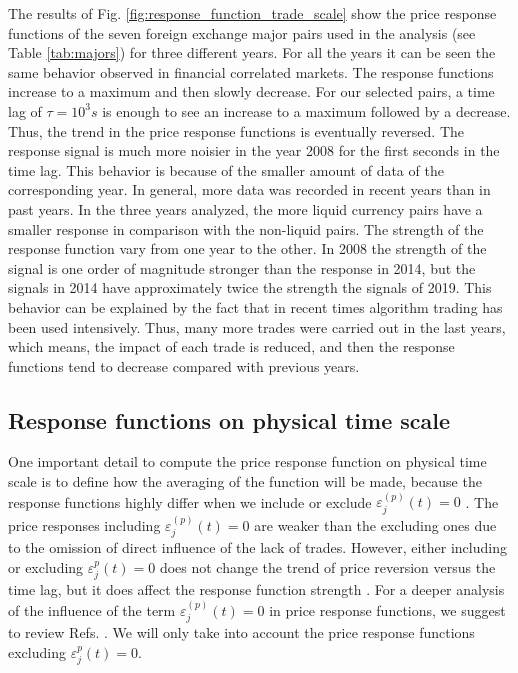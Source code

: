 The results of Fig. \ref{fig:response_function_trade_scale} show the
price response functions of the seven foreign exchange major pairs used in the
analysis (see Table \ref{tab:majors}) for three different years. For all the
years it can be seen the same behavior observed in financial correlated
markets. The response functions increase to a maximum and then slowly decrease.
For our selected pairs, a time lag of $\tau = 10^{3}s$ is enough to see an
increase to a maximum followed by a decrease. Thus, the trend in the price
response functions is eventually reversed. The response signal is much more
noisier in the year 2008 for the first seconds in the time lag. This behavior
is because of the smaller amount of data of the corresponding year. In general,
more data was recorded in recent years than in past years. In the three years
analyzed, the more liquid currency pairs have a smaller response in comparison
with the non-liquid pairs. The strength of the response function vary from one
year to the other. In 2008 the strength of the signal is one order of magnitude
stronger than the response in 2014, but the signals in 2014 have approximately
twice the strength the signals of 2019. This behavior can be explained by the
fact that in recent times algorithm trading has been used intensively. Thus,
many more trades were carried out in the last years, which means, the impact of
each trade is reduced, and then the response functions tend to decrease
compared with previous years.

\subsection{Response functions on physical time scale}
\label{subsec:response_function_physical}

One important detail to compute the price response function on physical time
scale is to define how the averaging of the function will be made, because the
response functions highly differ when we include or exclude
$\varepsilon^{\left(p\right)}_j \left( t\right) = 0$ \cite{Wang_2016_cross}.
The price responses including
$\varepsilon^{\left(p\right)}_j \left( t\right) = 0$ are weaker than the
excluding ones due to the omission of direct influence of the lack of trades.
However, either including or excluding $\varepsilon^{p}_j \left( t\right) = 0$
does not change the trend of price reversion versus the time lag, but it does
affect the response function strength \cite{Wang_2016_avg}. For a deeper
analysis of the influence of the term
$\varepsilon^{\left(p\right)}_j \left( t\right) = 0$ in price response
functions, we suggest to review Refs. \cite{Wang_2016_avg,Wang_2016_cross}. We
will only take into account the price response functions excluding
$\varepsilon^{p}_j \left( t\right) = 0$.

